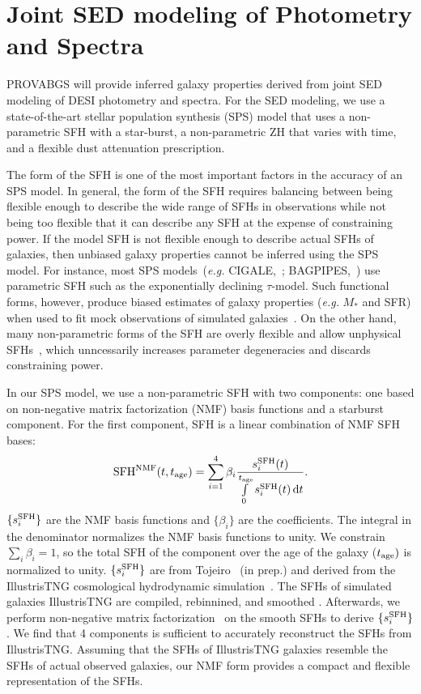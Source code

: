 \section{Joint SED modeling of Photometry and Spectra} \label{sec:methods}
PROVABGS will provide inferred galaxy properties derived from joint SED
modeling of DESI photometry and spectra. 
For the SED modeling, we use a state-of-the-art stellar population synthesis
(SPS) model that uses a non-parametric SFH with a star-burst, a non-parametric
ZH that varies with time, and a flexible dust attenuation prescription. 

The form of the SFH is one of the most important factors in the accuracy of an
SPS model.
In general, the form of the SFH requires balancing between being flexible enough
to describe the wide range of SFHs in observations while not being too flexible
that it can describe any SFH at the expense of constraining power.  
If the model SFH is not flexible enough to describe actual SFHs of galaxies,
then unbiased galaxy properties cannot be inferred using the SPS model. 
For instance, most SPS models~(\emph{e.g.} CIGALE,~\citealt{serra2011};
BAGPIPES,~\citealt{carnall2017}) use parametric SFH such as the exponentially
declining $\tau$-model.
Such functional forms, however, produce biased estimates of galaxy properties
(\emph{e.g.} $M_*$ and SFR) when used to fit mock observations of simulated 
galaxies~\citep{simha2014, pacific2015, carnall2018}.
On the other hand, many non-parametric forms of the SFH are overly flexible
and allow unphysical SFHs~\citep{leja2019}, which unncessarily increases 
parameter degeneracies and discards constraining power. 

In our SPS model, we use a non-parametric SFH with two components: one based on
non-negative matrix factorization (NMF) basis functions and a starburst component.
For the first component, SFH is a linear combination of NMF SFH bases:
\begin{equation} \label{eq:nmf} 
    {\rm SFH}^{\rm NMF} (t, t_{\rm age}) = \sum\limits_{i=1}^{4} \beta_i
    \frac{s_i^{\rm SFH}(t)}{\int\limits_0^{t_{\rm age}} s_i^{\rm SFH}(t) \,
    {\rm d}t}. 
\end{equation} 
$\{s^{\rm SFH}_i\}$ are the NMF basis functions and $\{\beta_i\}$ are the
coefficients. 
The integral in the denominator normalizes the NMF basis functions to unity. 
We constrain $\sum_i \beta_i = 1$, so the total SFH of the component over the
age of the galaxy ($t_{\rm age})$ is normalized to unity.
$\{s^{\rm SFH}_i\}$ are from Tojeiro \etal~(in prep.) and derived from the
IllustrisTNG cosmological hydrodynamic simulation~\citep{nelson2018,
pillepich2018, springel2018}.
The SFHs of simulated galaxies IllustrisTNG are compiled, rebinnined, and smoothed
. 
Afterwards, we perform non-negative matrix
factorization~\citep{lee1999,cichocki2009, fevotte2011} on the smooth SFHs to
derive $\{s^{\rm SFH}_i\}$. 
We find that 4 components is sufficient to accurately reconstruct the SFHs
from IllustrisTNG. 
Assuming that the SFHs of IllustrisTNG galaxies resemble the SFHs of actual
observed galaxies, our NMF form provides a compact and flexible representation
of the SFHs. 

